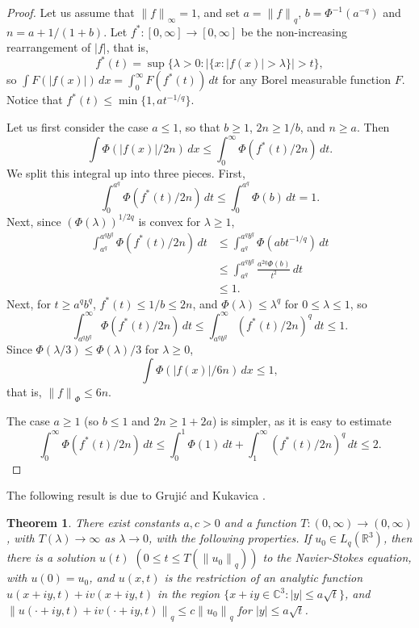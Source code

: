 \documentclass[12pt]{amsart}
\newtheorem{thm}{Theorem}[section]
\theoremstyle{remark}
\newcommand{\R}{{\mathbb R}}
\newcommand{\C}{{\mathbb C}}
\newcommand{\modo}[1]{{\left|#1\right|}}
\newcommand{\smodo}[1]{{\mathopen|#1\mathclose|}}
\newcommand{\snormo}[1]{{\mathopen\|#1\mathclose\|}}
\begin{document}
\begin{proof}
Let us assume that $\snormo f_\infty = 1$, 
and set $a = \snormo f_q$, $b = \Phi^{-1}(a^{-q})$ and
$n = a+1/(1+b)$.  
Let $f^*:[0,\infty]\to[0,\infty]$ be the non-increasing rearrangement
of $\modo{f}$, that is,
$$ f^*(t) =  
   \sup \{ \lambda>0 : \smodo{\{ x:\smodo{f(x)}>\lambda\}} > t \} ,$$
so $\int F(\modo{f(x)}) \, dx = \int_0^\infty F(f^*(t)) \, dt$ for any
Borel measurable function $F$.  Notice that $f^*(t) \le \min\{1,a t^{-1/q}\}$.

Let us first
consider the case $a \le 1$, so that $b \ge 1$, $2n \ge 1/b$, and
$n \ge a$.
Then
$$
   \int \Phi(\modo{f(x)}/2n) \, dx
   \le
   \int_0^\infty \Phi(f^*(t)/2n) \, dt .$$
We split this integral up into three pieces.  First,
$$ 
   \int_0^{a^q} \Phi(f^*(t)/2n) \, dt 
   \le
   \int_0^{a^q} \Phi(b) \, dt 
   = 1.
$$
Next, since $(\Phi(\lambda))^{1/2q}$ is convex for $\lambda \ge 1$,
\begin{align*}
   \int_{a^q}^{a^q b^q} \Phi(f^*(t)/2n) \, dt 
   &\le
   \int_{a^q}^{a^q b^q} \Phi(abt^{-1/q}) \, dt \\
   &\le 
   \int_{a^q}^{a^q b^q} \frac{a^{2q}\Phi(b)}{t^2} \, dt  \\
   &\le 1.
\end{align*}
Next, for $t \ge a^q b^q$, $f^*(t) \le 1/b \le 2n$, and
$\Phi(\lambda) \le \lambda^q$ for $0 \le \lambda \le 1$, so
$$
   \int_{a^q b^q}^\infty \Phi(f^*(t)/2n) \, dt 
   \le
   \int_{a^q b^q}^\infty (f^*(t)/2n)^q \, dt 
   \le 1.
$$
Since $\Phi(\lambda/3) \le \Phi(\lambda)/3$ for
$\lambda\ge0$,
$$
   \int \Phi(\modo{f(x)}/6n) \, dx
   \le 1 ,
$$
that is, $\snormo f_\Phi \le 6 n$.

The case $a \ge 1$ (so $b \le 1$ and $2n \ge 1+2a$) is simpler, as
it is easy to estimate
$$
   \int_0^\infty \Phi(f^*(t)/2n) \, dt 
   \le
   \int_0^1 \Phi(1) \, dt 
   +
   \int_1^\infty (f^*(t)/2n)^q \, dt 
   \le 2.
$$

\end{proof}

The following result is due to 
Gruji\'c and Kukavica \cite{grujic-kukavica}.

\begin{thm} \label{space analytic}
There exist constants $a,c>0$ and a function
$T:(0,\infty) \to (0,\infty)$, with $T(\lambda) \to \infty$ as $\lambda\to 0$,
with the following properties.  If $u_0 \in L_q(\R^3)$, then there is
a solution $u(t)$ $(0 \le t \le T(\snormo{u_0}_q))$
to the Navier-Stokes equation, with $u(0) = u_0$, and
$u(x,t)$ is the restriction of an analytic function 
$u(x+iy,t) + iv(x+iy,t)$ in the region
$\{x+iy \in \C^3 : \smodo y \le a \sqrt t\}$, and
$\snormo{u(\cdot+iy,t) + iv(\cdot+iy,t)}_q \le c \snormo{u_0}_q$ for
$\smodo y \le a \sqrt t$.
\end{thm}
\end{document}
